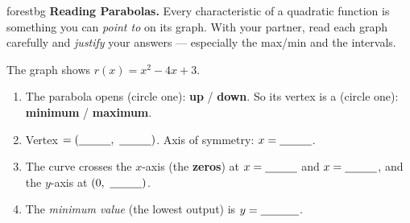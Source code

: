 \documentclass[10pt]{article}
\newcommand{\lgrid}[4]{%
  \draw[step=1, linegray!40, very thin] (#1,#3) grid (#2,#4);
  \draw[->, semithick, charcoal] (#1,0)--(#2,0) node[below right, font=\scriptsize]{$x$};
  \draw[->, semithick, charcoal] (0,#3)--(0,#4) node[left, font=\scriptsize]{$y$};}
\begin{document}

\vspace{0.08in}

\begin{headlinebox}{forestbg}
\small\textbf{Reading Parabolas.} Every characteristic of a quadratic function is something you can
\emph{point to} on its graph. With your partner, read each graph carefully and \emph{justify} your
answers --- especially the max/min and the intervals.
\end{headlinebox}

\vspace{0.06in}

\begin{tcolorbox}[colback=white, colframe=black!40, title=\textbf{Tier R --- Remediate},
    fonttitle=\bfseries, arc=1.5mm, left=3mm, right=3mm, top=2mm, bottom=2mm, breakable]
The graph shows $r(x) = x^2 - 4x + 3$.
\begin{center}
\end{center}
\begin{enumerate}[leftmargin=1.7em, itemsep=7pt]
  \item The parabola opens (circle one): \textbf{up} \; / \; \textbf{down}. \quad So its vertex is a
        (circle one): \textbf{minimum} \; / \; \textbf{maximum}.
  \item Vertex $=(\blank{1.0cm},\ \blank{1.0cm})$. \quad Axis of symmetry: $x=\blank{1.0cm}$.
  \item The curve crosses the $x$-axis (the \textbf{zeros}) at $x=\blank{1.0cm}$ and $x=\blank{1.0cm}$,
        and the $y$-axis at $(0,\ \blank{1.0cm})$.
  \item The \emph{minimum value} (the lowest output) is $y=\blank{1.2cm}$.
\end{enumerate}
\end{tcolorbox}
\end{document}
